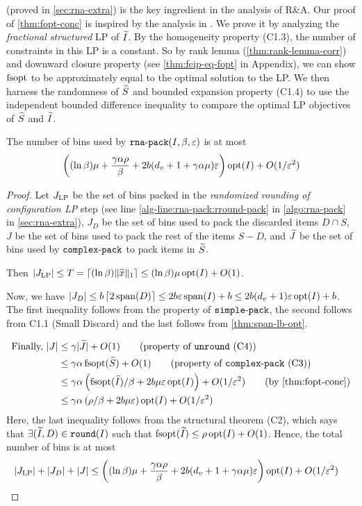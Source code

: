  (proved in \cref{sec:rna-extra})
is the key ingredient in the analysis of R\&A.
Our proof of \cref{thm:fopt-conc} is inspired by the analysis in \cite{khan-thesis}.
We prove it by analyzing the \emph{fractional structured} \config{} LP of $\widetilde{I}$.
By the homogeneity property (C1.3), the number of constraints in this LP is a constant.
So by rank lemma (\cref{thm:rank-lemma-corr}) and downward closure
property (see \cref{thm:fcip-eq-fopt} in Appendix), we can show
$\operatorname{fsopt}$ to be approximately equal to the optimal solution to the LP.
We then harness the randomness of $\widetilde{S}$ and bounded expansion
property (C1.4) to use the
independent bounded difference inequality \cite{mcdiarmid1989method}
to compare the optimal LP objectives of $\widetilde{S}$ and $\widetilde{I}$.

\begin{theorem}
\label{thm:rna-pack}
The number of bins used by $\operatorname{\mathtt{rna-pack}}(I, \beta, \varepsilon)$ is at most
\[ \left( (\ln\beta)\mu + \frac{\gamma\alpha\rho}{\beta}
    + 2b(d_v+1+\gamma\alpha\mu)\varepsilon \right) \operatorname{opt}(I) + O(1/\varepsilon^2) \]
\end{theorem}
\begin{proof}
Let $J_{\operatorname{LP}}$ be the set of bins packed in the {\em randomized rounding of
configuration LP} step
(see line \ref{alg-line:rna-pack:rround-pack} in \cref{algo:rna-pack}
in \cref{sec:rna-extra}),
$J_D$ be the set of bins used to pack the discarded items $D \cap S$,
$J$ be the set of bins used to pack the rest of the items $S - D$,
and $\widetilde{J}$ be the set of bins used by $\operatorname{\mathtt{complex-pack}}$ to pack items in $\widetilde{S}$.

Then $|J_{\operatorname{LP}}| \le T = \lceil (\ln\beta)\lVert \widehat{x} \rVert_1 \rceil \le (\ln\beta)\mu\operatorname{opt}(I) + O(1)$.

Now, we have $|J_D| \le b\left\lceil 2\operatorname{span}(D) \right\rceil \le 2b\varepsilon\operatorname{span}(I) + b \le 2b(d_v+1)\varepsilon\operatorname{opt}(I) + b$.
The first inequality follows from the property of $\operatorname{\mathtt{simple-pack}}$, the second follows from
C1.1 (Small Discard) and the last follows from \cref{thm:span-lb-opt}.

\begin{align*}
\text{Finally, } |J| &\le \gamma|\Jtild| + O(1)  \tag{property of $\unround$ (C4)}
\\ &\le \gamma\alpha\fsopt(\Stild) + O(1)  \tag{property of $\complexPack$ (C3)}
\\ &\le \gamma\alpha\left( {\fsopt(\Itild)}/{\beta} + 2b\mu\eps\opt(I) \right) + O(1/\eps^2)
    \tag{by \cref{thm:fopt-conc}}
\\ &\le \gamma\alpha\left(\rho/\beta + 2b\mu\eps\right)\opt(I) + O(1/\eps^2)
\end{align*}
Here, the last inequality follows from the structural theorem (C2),
which says that $\exists (\widetilde{I}, D) \in \operatorname{\mathtt{round}}(I)$ such that
$\operatorname{fsopt}(\widetilde{I}) \le \rho\operatorname{opt}(I) + O(1)$.
Hence, the total number of bins is at most
\begin{align*}
& |J_{\operatorname{LP}}| + |J_D| + |J|
\le \left( (\ln\beta)\mu + \frac{\gamma\alpha\rho}{\beta}
    + 2b(d_v+1+\gamma\alpha\mu)\varepsilon \right)\operatorname{opt}(I) + O(1/\varepsilon^2)
\qedhere \end{align*}
\end{proof}

